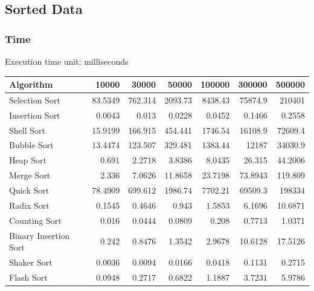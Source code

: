 \subsection{Sorted Data}
\subsubsection{Time}
Execution time unit: milliseconds

\begin{table}[h!]
\centering
\begin{tabular}{|l|r|r|r|r|r|r|}
\hline
\textbf{Algorithm} & \textbf{10000} & \textbf{30000} & \textbf{50000} & \textbf{100000} & \textbf{300000} & \textbf{500000} \\
\hline
Selection Sort & 83.5349 & 762.314 & 2093.73 & 8438.43 & 75874.9 & 210401 \\ \hline
Insertion Sort & 0.0043 & 0.013 & 0.0228 & 0.0452 & 0.1466 & 0.2558 \\ \hline
Shell Sort & 15.9199 & 166.915 & 454.441 & 1746.54 & 16108.9 & 72609.4 \\ \hline
Bubble Sort & 13.4474 & 123.507 & 329.481 & 1383.44 & 12187 & 34030.9 \\ \hline
Heap Sort & 0.691 & 2.2718 & 3.8386 & 8.0435 & 26.315 & 44.2006 \\ \hline
Merge Sort & 2.336 & 7.0626 & 11.8658 & 23.7198 & 73.8943 & 119.809 \\ \hline
Quick Sort & 78.4909 & 699.612 & 1986.74 & 7702.21 & 69509.3 & 198334 \\ \hline
Radix Sort & 0.1545 & 0.4646 & 0.943 & 1.5853 & 6.1696 & 10.6871 \\ \hline
Counting Sort & 0.016 & 0.0444 & 0.0809 & 0.208 & 0.7713 & 1.0371 \\ \hline
Binary Insertion Sort & 0.242 & 0.8476 & 1.3542 & 2.9678 & 10.6128 & 17.5126 \\ \hline
Shaker Sort & 0.0036 & 0.0094 & 0.0166 & 0.0418 & 0.1131 & 0.2715 \\ \hline
Flash Sort & 0.0948 & 0.2717 & 0.6822 & 1.1887 & 3.7231 & 5.9786 \\
\hline
\end{tabular}
\label{table:execution_time}
\end{table}

